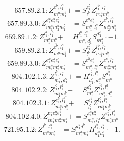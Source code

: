 \documentclass[letterpaper,10pt,fleqn,leqno,onecolumn]{article}
\begin{document}
\begin{equation} \;\;\;\;\;\;  657.89.2.1: Z^{e_{1}^{b},l_{1}^{a}}_{m_{1}^{a}m_{1}^{b}}+=S^{e_{1}^{b}}_{l_{1}^{b}}Z^{l_{1}^{b},l_{1}^{a}}_{m_{1}^{a}m_{1}^{b}} \end{equation}
\begin{equation} \;\;\;\;\;\;  657.89.3.0: Z^{e_{1}^{a}e_{2}^{a}e_{1}^{b}}_{m_{1}^{a}m_{2}^{a}m_{1}^{b}}+=S^{e_{1}^{a}e_{2}^{a}}_{m_{1}^{a},l_{1}^{a}}Z^{e_{1}^{b},l_{1}^{a}}_{m_{2}^{a}m_{1}^{b}} \end{equation}
\begin{equation} \;\;\;\;\;\;  659.89.1.2: Z^{l_{1}^{b},l_{1}^{a}}_{m_{1}^{a}m_{1}^{b}}+=H^{l_{1}^{b},l_{1}^{a}}_{m_{1}^{a},d_{1}^{b}}S^{d_{1}^{b}}_{m_{1}^{b}}\cdot -1. \end{equation}
\begin{equation} \;\;\;\;\;\;  659.89.2.1: Z^{e_{1}^{b},l_{1}^{a}}_{m_{1}^{a}m_{1}^{b}}+=S^{e_{1}^{b}}_{l_{1}^{b}}Z^{l_{1}^{b},l_{1}^{a}}_{m_{1}^{a}m_{1}^{b}} \end{equation}
\begin{equation} \;\;\;\;\;\;  659.89.3.0: Z^{e_{1}^{a}e_{2}^{a}e_{1}^{b}}_{m_{1}^{a}m_{2}^{a}m_{1}^{b}}+=S^{e_{1}^{a}e_{2}^{a}}_{m_{1}^{a},l_{1}^{a}}Z^{e_{1}^{b},l_{1}^{a}}_{m_{2}^{a}m_{1}^{b}} \end{equation}
\begin{equation} \;\;\;\;\;\;  804.102.1.3: Z^{l_{1}^{b},l_{1}^{a}}_{m_{1}^{b},d_{1}^{a}}+=H^{l_{1}^{b},l_{1}^{a}}_{d_{1}^{b},d_{1}^{a}}S^{d_{1}^{b}}_{m_{1}^{b}} \end{equation}
\begin{equation} \;\;\;\;\;\;  804.102.2.2: Z^{l_{1}^{b},l_{1}^{a}}_{m_{1}^{a}m_{1}^{b}}+=S^{d_{1}^{a}}_{m_{1}^{a}}Z^{l_{1}^{b},l_{1}^{a}}_{m_{1}^{b},d_{1}^{a}} \end{equation}
\begin{equation} \;\;\;\;\;\;  804.102.3.1: Z^{e_{1}^{b},l_{1}^{a}}_{m_{1}^{a}m_{1}^{b}}+=S^{e_{1}^{b}}_{l_{1}^{b}}Z^{l_{1}^{b},l_{1}^{a}}_{m_{1}^{a}m_{1}^{b}} \end{equation}
\begin{equation} \;\;\;\;\;\;  804.102.4.0: Z^{e_{1}^{a}e_{2}^{a}e_{1}^{b}}_{m_{1}^{a}m_{2}^{a}m_{1}^{b}}+=S^{e_{1}^{a}e_{2}^{a}}_{m_{1}^{a},l_{1}^{a}}Z^{e_{1}^{b},l_{1}^{a}}_{m_{2}^{a}m_{1}^{b}} \end{equation}
\begin{equation} \;\;\;\;\;\;  721.95.1.2: Z^{l_{1}^{b},l_{1}^{a}}_{m_{1}^{a}m_{1}^{b}}+=S^{d_{1}^{a}d_{1}^{b}}_{m_{1}^{a}m_{1}^{b}}H^{l_{1}^{b},l_{1}^{a}}_{d_{1}^{a}d_{1}^{b}}\cdot -1. \end{equation}
\end{document}
